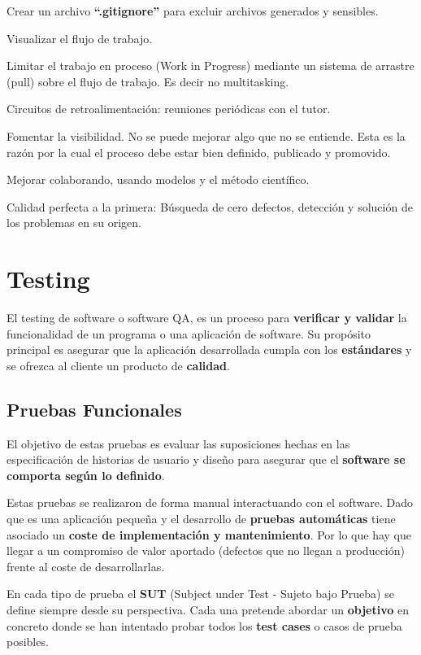 \documentclass[12pt,twoside,titlepage]{report}
\begin{document}
\begin{compactitem}
    \item Crear un archivo \textbf{``.gitignore''} para excluir archivos generados y sensibles.
    \item Visualizar el flujo de trabajo.
    \item Limitar el trabajo en proceso (Work in Progress) mediante un sistema de arrastre (pull) sobre el flujo de trabajo. Es decir no multitasking.
    \item Circuitos de retroalimentación: reuniones periódicas con el tutor.
    \item Fomentar la visibilidad. No se puede mejorar algo que no se entiende. Esta es la razón por la cual el proceso debe estar bien definido, publicado y promovido.
    \item Mejorar colaborando, usando modelos y el método científico.
    \item Calidad perfecta a la primera: Búsqueda de cero defectos, detección y solución de los problemas en su origen.
\end{compactitem}

\section{Testing}

El testing de software o software QA, es un proceso para \textbf{verificar y validar} la funcionalidad de un programa o una aplicación de software. Su propósito principal es asegurar que la aplicación desarrollada cumpla con los \textbf{estándares} y se ofrezca al cliente un producto de \textbf{calidad}.

\subsection{Pruebas Funcionales}

El objetivo de estas pruebas es evaluar las suposiciones hechas en las especificación de historias de usuario y diseño para asegurar que el \textbf{software se comporta según lo definido}.

Estas pruebas se realizaron de forma manual interactuando con el software. Dado que es una aplicación pequeña y el desarrollo de \textbf{pruebas automáticas} tiene asociado un \textbf{coste de implementación y mantenimiento}. Por lo que hay que llegar a un compromiso de valor aportado (defectos que no llegan a producción) frente al coste de desarrollarlas. 

En cada tipo de prueba el \textbf{SUT} (Subject under Test - Sujeto bajo Prueba) se define siempre desde su perspectiva. Cada una pretende abordar un \textbf{objetivo} en concreto donde se han intentado probar todos los \textbf{test cases} o casos de prueba posibles.
\end{document}
